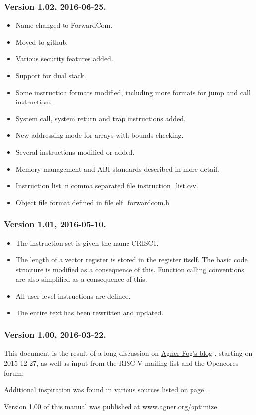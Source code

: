 \documentclass[forwardcom.tex]{subfiles}
\begin{document}
\subsubsection{Version 1.02, 2016-06-25.}
\begin{itemize}
\item Name changed to ForwardCom.
\item Moved to github.
\item Various security features added.
\item Support for dual stack.
\item Some instruction formats modified, including more formats for jump and call instructions.
\item System call, system return and trap instructions added.
\item New addressing mode for arrays with bounds checking.
\item Several instructions modified or added.
\item Memory management and ABI standards described in more detail.
\item Instruction list in comma separated file instruction\_list.csv.
\item Object file format defined in file elf\_forwardcom.h
\end{itemize}

\subsubsection{Version 1.01, 2016-05-10.}
\begin{itemize}
\item The instruction set is given the name CRISC1.
\item The length of a vector register is stored in the register itself. The basic code structure is modified as a consequence of this. Function calling conventions are also simplified as a consequence of this.
\item All user-level instructions are defined.
\item The entire text has been rewritten and updated.
\end{itemize}

\subsubsection{Version 1.00, 2016-03-22.}
This document is the result of a long discussion on 
\href{http://www.agner.org/optimize/blog/read.php?i=421}{Agner Fog's blog}
, starting on 2015-12-27, as well as input from the RISC-V mailing list and the Opencores forum.
\vspace{2mm}

Additional inspiration was found in various sources listed on page \pageref{referencesToIntroduction}. 
\vspace{2mm}

Version 1.00 of this manual was published at 
\href{http://www.agner.org/optimize}{www.agner.org/optimize}.
\end{document}
